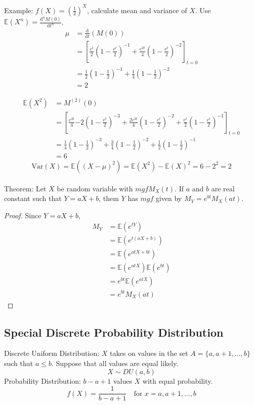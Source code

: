 \documentclass{article}
\newcommand{\E}{\mathbb{E}}
\newcommand{\Var}{\mathrm{Var}}
\newcommand{\nder}[3]{\frac{\mathrm{d}^{#1} #2}{\mathrm{d} #3^{#1}}}
\begin{document}
\noindent Example: $f(X) = (\frac{1}{2})^X$, calculate mean and variance of $X$.
Use $\E(X^n) = \nder{n}{M(0)}{t}$.
\begin{align*}
\mu &= \frac{\mathrm{d}}{\mathrm{d}t}(M(0))\\
    &= \left[ \frac{e^t}{2}(1 - \frac{e^t}{2})^{-1} + \frac{e^{2t}}{4}(1- \frac{e^t}{2})^{-2} \right]_{t = 0}\\
    &=\frac{1}{2}(1 - \frac{1}{2})^{-1} + \frac{1}{4}(1 - \frac{1}{2})^{-2}\\
    &= 2
\end{align*}

\begin{align*}
    \E(X ^ 2) &= M^{(2)}(0) \\
              &= \left[ \frac{e^{2t}}{4}{-2}(1- \frac{e^t}{2})^{-3} + \frac{2e^{2t}}{4}(1 - \frac{e^t}{2})^{-2} + \frac{e^t}{2}(1 - \frac{e^t}{2})^{-1} \right]_{t = 0} \\
              &= \frac{1}{4}(1 - \frac{1}{2})^{-3} + \frac{3}{4}(1 - \frac{1}{2})^{-2} + \frac{1}{2}(1 - \frac{1}{2})^{-1} \\
              &= 6
\end{align*}
$$\Var(X) = \E((X - \mu)^2) = \E(X^2) - \E(X) ^2 = 6 - 2^2 = 2$$\\

\noindent Theorem: Let $X$ be random variable with $mgf M_{X}(t)$. If $a$ and $b$ are real constant such that $Y = aX + b$, them $Y$ has $mgf$ given by $M_{Y} = e^{bt}M_{X}(at)$.

\begin{proof}
Since $Y = aX + b$,
\begin{align*}
    M_{Y} &= \E(e^{tY}) \\
          &= \E(e^{t(aX+b)}) \\ 
          &= \E(e^{atX + bt}) \\
          &= \E(e^{atX})\E(e^{bt}) \\
          &= e^{bt}\E(e^{atX}) \\ 
          &= e^{bt}M_{X}({at})
\end{align*}
\end{proof}

\subsection{Special Discrete  Probability Distribution}
\noindent Discrete Uniform Distribution: $X$ takes on values in the set $A = \{a, a + 1, ... , b\}$ such that $a \le b$. Suppose that all values are equal likely.
$$X \sim DU(a, b)$$
\noindent Probability Distribution: $b - a + 1$ values $X$ with equal probability.
$$f(X) = \frac{1}{b - a + 1} \quad \text{for } x = a, a+1, ... , b$$ 
\end{document}
